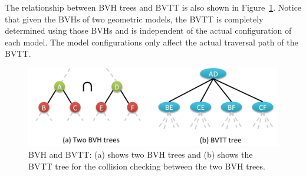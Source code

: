 The relationship between BVH trees and BVTT is also shown in Figure~\ref{fig:5:BVTT}. Notice that given the BVHs
of two geometric models, the BVTT is completely determined using those BVHs and is independent of the actual configuration of
each model. The model configurations only affect the actual traversal path of the BVTT.

\begin{figure}[t]
  \centering
  \includegraphics[width=\linewidth]{figs/5/BVTT.pdf}
  \caption[Illustrations of BVH and BVTT]{BVH and BVTT: (a) shows two BVH trees and (b) shows the BVTT tree for the collision checking between the two BVH trees.}
  \label{fig:5:BVTT}
\end{figure}

